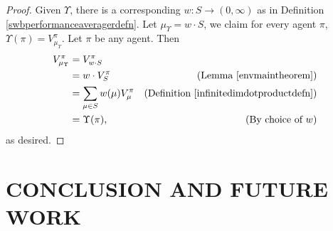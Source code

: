 \documentclass[twoside]{article}
\begin{document}
\begin{proof}
    Given $\Upsilon$, there is a corresponding $w:S\to(0,\infty)$ as in
    Definition \ref{swbperformanceaveragerdefn}.
    Let $\mu_\Upsilon=w\cdot S$, we claim for every agent $\pi$,
    $\Upsilon(\pi)=V^\pi_{\mu_\Upsilon}$. Let $\pi$ be any agent. Then
    \begin{align*}
        V^\pi_{\mu_\Upsilon}
            &= V^\pi_{w\cdot S}\\
            &= w\cdot V^\pi_{S}
                &\mbox{(Lemma \ref{envmaintheorem})}\\
            &= \sum_{\mu\in S}w(\mu)V^\pi_\mu
                &\mbox{(Definition \ref{infinitedimdotproductdefn})}\\
            &= \Upsilon(\pi),
                &\mbox{(By choice of $w$)}
    \end{align*}
    as desired.
\end{proof}

\section{CONCLUSION AND FUTURE WORK}



%
%
%
%
%

\pagebreak

\onecolumn

\setcounter{section}{0}
\end{document}
